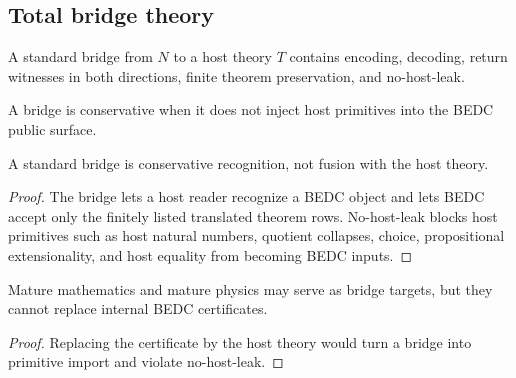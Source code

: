 
\subsection{Total bridge theory}
\label{subsec:philosophy-total-bridge}

\begin{definition}
\label{def:philosophy-standard-bridge-total}
A standard bridge from \(N\) to a host theory \(T\) contains encoding,
decoding, return witnesses in both directions, finite theorem
preservation, and no-host-leak.
\end{definition}

\begin{definition}
\label{def:philosophy-conservative-bridge-total}
A bridge is conservative when it does not inject host primitives into
the BEDC public surface.
\end{definition}

\begin{theorem}
\label{thm:philosophy-bridge-not-fusion-total}
A standard bridge is conservative recognition, not fusion with the host
theory.
\end{theorem}
\begin{proof}
The bridge lets a host reader recognize a BEDC object and lets BEDC
accept only the finitely listed translated theorem rows. No-host-leak
blocks host primitives such as host natural numbers, quotient
collapses, choice, propositional extensionality, and host equality
from becoming BEDC inputs.
\end{proof}

\begin{corollary}
\label{cor:philosophy-mature-systems-bridge-targets-total}
Mature mathematics and mature physics may serve as bridge targets, but
they cannot replace internal BEDC certificates.
\end{corollary}
\begin{proof}
Replacing the certificate by the host theory would turn a bridge into
primitive import and violate no-host-leak.
\end{proof}
